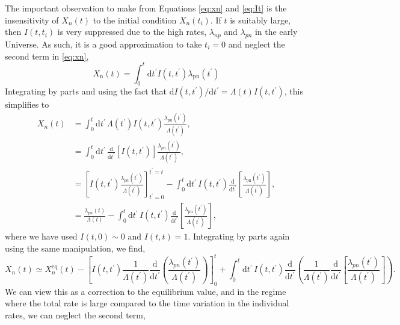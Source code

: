 \documentclass[11pt]{article}
\numberwithin{equation}{section}
\numberwithin{figure}{section}
\numberwithin{table}{section}
\begin{document}
The important observation to make from Equations \eqref{eq:xn} and \eqref{eq:It} is the insensitivity of $X_n(t)$ to the initial condition $X_n(t_i)$. If $t$ is suitably large, then $I(t, t_i)$ is very suppressed due to the high rates, $\lambda_{np}$ and $\lambda_{pn}$ in the early Universe. As such, it is a good approximation to take $t_i = 0$ and neglect the second term in \eqref{eq:xn},
\begin{equation}
X_{\mathrm{n}}(t)=\int_{0}^{t} \mathrm{d} t^{\prime} I\left(t, t^{\prime}\right) \lambda_{\mathrm{pn}}\left(t^{\prime}\right)
\end{equation}
Integrating by parts and using the fact that $\mathrm{d}I(t, t^{\prime})/\mathrm{d}t^{\prime} = \Lambda(t)I(t, t^{\prime})$, this simplifies to
\begin{align*}
X_n(t) &= \int_{0}^{t}{\mathrm{d}t^{\prime} \, \Lambda(t^{\prime}) I(t, t^{\prime}) \frac{\lambda_{pn}(t^{\prime})}{\Lambda(t^{\prime})}}, \\
&= \int_0^{t}{\mathrm{d}t^{\prime}\, \frac{\mathrm{d}}{\mathrm{d}t^{\prime}}\left[I(t, t^{\prime})\right] \frac{\lambda_{pn}(t^{\prime})}{\Lambda(t^{\prime})}}, \\
&= \left[I(t, t^{\prime}) \frac{\lambda_{pn}(t^{\prime})}{\Lambda(t^{\prime})}\right]_{t^{\prime} = 0}^{t^{\prime} = t} -\int_{0}^{t} \mathrm{d} t^{\prime}\, I\left(t, t^{\prime}\right) \frac{\mathrm{d}}{\mathrm{d} t^{\prime}}\left[\frac{\lambda_{\mathrm{pn}}\left(t^{\prime}\right)}{\Lambda\left(t^{\prime}\right)}\right], \\
&= \frac{\lambda_{\mathrm{pn}}(t)}{\Lambda(t)}-\int_{0}^{t} \mathrm{d} t^{\prime}\, I\left(t, t^{\prime}\right) \frac{\mathrm{d}}{\mathrm{d} t^{\prime}}\left[\frac{\lambda_{\mathrm{pn}}\left(t^{\prime}\right)}{\Lambda\left(t^{\prime}\right)}\right],
\end{align*}
where we have used $I(t, 0) \sim 0$ and $I(t, t) = 1$. Integrating by parts again using the same manipulation, we find,
\begin{equation}
X_n(t) \simeq X_n^{\mathrm{eq}}(t) - \left[I(t, t^{\prime}) \frac{1}{\Lambda(t^{\prime})} \frac{\mathrm{d}}{\mathrm{d}t^{\prime}}\left(\frac{\lambda_{pn}(t^{\prime})}{\Lambda(t^{\prime})}\right)\right]^{t}_{0} + \int_{0}^{t}{\mathrm{d}t^{\prime}\,I(t, t^{\prime}) \frac{\mathrm{d}}{\mathrm{d}t^{\prime}}\left(\frac{1}{\Lambda(t^{\prime})} \frac{\mathrm{d}}{\mathrm{d}t^{\prime}}\left[\frac{\lambda_{pn}(t^{\prime})}{\Lambda(t^{\prime})}\right]\right)}.
\end{equation}
We can view this as a correction to the equilibrium value, and in the regime where the total rate is large compared to the time variation in the individual rates, we can neglect the second term,
\end{document}
